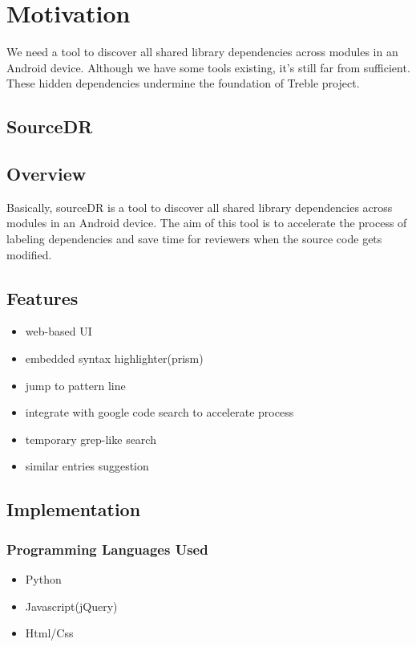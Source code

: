 \documentclass[12pt, portrait]{article}
\begin{document}
\section*{Motivation}
We need a tool to discover all shared library dependencies across modules in an Android device.
Although we have some tools existing, it's still far from sufficient.
These hidden dependencies undermine the foundation of Treble project.

\begin{multicols}{2}
  \section*{SourceDR}
  \subsection*{Overview}
  Basically, sourceDR is a tool to discover all shared library dependencies across modules in an Android device. The aim of this tool is to accelerate the process of labeling dependencies and save time for reviewers when the source code gets modified.
  \subsection*{Features}
      {\color{secondary}
        \begin{itemize}
        \item web-based UI
        \item embedded syntax highlighter(prism)
        \item jump to pattern line
        \item integrate with google code search to accelerate process
        \item temporary grep-like search
        \item similar entries suggestion
        \end{itemize}
      }
  \subsection*{Implementation}
    \subsubsection*{Programming Languages Used}
    {\color{secondary}
      \begin{itemize}
      \item Python
      \item Javascript(jQuery)
      \item Html/Css
      \end{itemize}
    }

\end{multicols}
\end{document}
